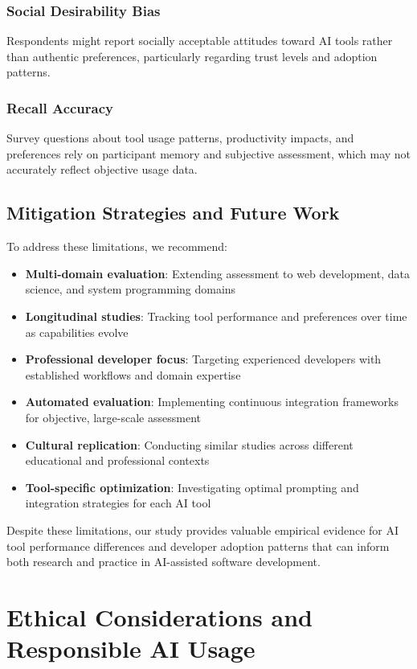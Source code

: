 \documentclass[conference]{IEEEtran}
\begin{document}
\subsubsection{Social Desirability Bias}
Respondents might report socially acceptable attitudes toward AI tools rather than authentic preferences, particularly regarding trust levels and adoption patterns.

\subsubsection{Recall Accuracy}
Survey questions about tool usage patterns, productivity impacts, and preferences rely on participant memory and subjective assessment, which may not accurately reflect objective usage data.

\subsection{Mitigation Strategies and Future Work}

To address these limitations, we recommend:

\begin{itemize}
    \item \textbf{Multi-domain evaluation}: Extending assessment to web development, data science, and system programming domains
    \item \textbf{Longitudinal studies}: Tracking tool performance and preferences over time as capabilities evolve
    \item \textbf{Professional developer focus}: Targeting experienced developers with established workflows and domain expertise
    \item \textbf{Automated evaluation}: Implementing continuous integration frameworks for objective, large-scale assessment
    \item \textbf{Cultural replication}: Conducting similar studies across different educational and professional contexts
    \item \textbf{Tool-specific optimization}: Investigating optimal prompting and integration strategies for each AI tool
\end{itemize}

Despite these limitations, our study provides valuable empirical evidence for AI tool performance differences and developer adoption patterns that can inform both research and practice in AI-assisted software development.

\section{Ethical Considerations and Responsible AI Usage}
\end{document}
